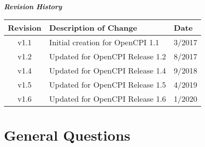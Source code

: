         \begin{center}
        \textit{\textbf{Revision History}}
                \begin{table}[H]
                \label{table:revisions} %
                        \begin{tabularx}{\textwidth}{|c|X|l|}
                        \hline
                        \rowcolor{blue}
                        \textbf{Revision} & \textbf{Description of Change} & \textbf{Date} \\
                        \hline
                        v1.1 & Initial creation for OpenCPI 1.1 & 3/2017 \\
                        \hline
                        v1.2 & Updated for OpenCPI Release 1.2 & 8/2017 \\
                        \hline
                        v1.4 & Updated for OpenCPI Release 1.4 & 9/2018 \\
                        \hline
                        v1.5 & Updated for OpenCPI Release 1.5 & 4/2019 \\
                        \hline
                        v1.6 & Updated for OpenCPI Release 1.6 & 1/2020 \\
                        \hline
                        \end{tabularx}
                \end{table}
        \end{center}
\newpage

\tableofcontents
\newpage

\section{General Questions}

